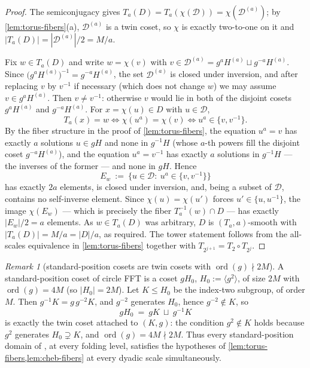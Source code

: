 \documentclass[11pt]{article}
\theoremstyle{definition}
\theoremstyle{remark}
\newtheorem{remark}[remark]{Remark}
\begin{document}
\begin{proof}
The semiconjugacy gives $T_a(D)=T_a(\chi(\mathcal D))=\chi(\mathcal D^{(a)})$; by \cref{lem:torus-fibers}(a), $\mathcal D^{(a)}$ is a twin coset, so $\chi$ is exactly two-to-one on it and $|T_a(D)|=|\mathcal D^{(a)}|/2=M/a$.

Fix $w\in T_a(D)$ and write $w=\chi(v)$ with $v\in\mathcal D^{(a)}=g^aH^{(a)}\sqcup g^{-a}H^{(a)}$. Since $\bigl(g^aH^{(a)}\bigr)^{-1}=g^{-a}H^{(a)}$, the set $\mathcal D^{(a)}$ is closed under inversion, and after replacing $v$ by $v^{-1}$ if necessary (which does not change $w$) we may assume $v\in g^aH^{(a)}$. Then $v\ne v^{-1}$: otherwise $v$ would lie in both of the disjoint cosets $g^aH^{(a)}$ and $g^{-a}H^{(a)}$. For $x=\chi(u)\in D$ with $u\in\mathcal D$,
\[
T_a(x)=w
\iff
\chi(u^a)=\chi(v)
\iff
u^a\in\{v,v^{-1}\}.
\]
By the fiber structure in the proof of \cref{lem:torus-fibers}, the equation $u^a=v$ has exactly $a$ solutions $u\in gH$ and none in $g^{-1}H$ (whose $a$-th powers fill the disjoint coset $g^{-a}H^{(a)}$), and the equation $u^a=v^{-1}$ has exactly $a$ solutions in $g^{-1}H$ --- the inverses of the former --- and none in $gH$. Hence
\[
E_w\ :=\ \{u\in\mathcal D:\ u^a\in\{v,v^{-1}\}\}
\]
has exactly $2a$ elements, is closed under inversion, and, being a subset of $\mathcal D$, contains no self-inverse element. Since $\chi(u)=\chi(u')$ forces $u'\in\{u,u^{-1}\}$, the image $\chi(E_w)$ --- which is precisely the fiber $T_a^{-1}(w)\cap D$ --- has exactly $|E_w|/2=a$ elements. As $w\in T_a(D)$ was arbitrary, $D$ is $(T_a,a)$-smooth with $|T_a(D)|=M/a=|D|/a$, as required. The tower statement follows from the all-scales equivalence in \cref{lem:torus-fibers} together with $T_{2^{j+1}}=T_2\circ T_{2^j}$.
\end{proof}

\begin{remark}[standard-position cosets are twin cosets with $\operatorname{ord}(g)\nmid2M$]\label{rem:standard-position}
A standard-position coset of circle FFT \cite{HLP24} is a coset $gH_0$, $H_0:=\langle g^2\rangle$, of size $2M$ with $\operatorname{ord}(g)=4M$ (so $|H_0|=2M$). Let $K\le H_0$ be the index-two subgroup, of order $M$. Then $g^{-1}K=g\,g^{-2}K$, and $g^{-2}$ generates $H_0$, hence $g^{-2}\notin K$, so
\[
gH_0\ =\ gK\ \sqcup\ g^{-1}K
\]
is exactly the twin coset attached to $(K,g)$: the condition $g^2\notin K$ holds because $g^2$ generates $H_0\supsetneq K$, and $\operatorname{ord}(g)=4M\nmid2M$. Thus every standard-position domain of \cite{HLP24}, at every folding level, satisfies the hypotheses of \cref{lem:torus-fibers,lem:cheb-fibers} at every dyadic scale simultaneously.
\end{remark}
\end{document}
